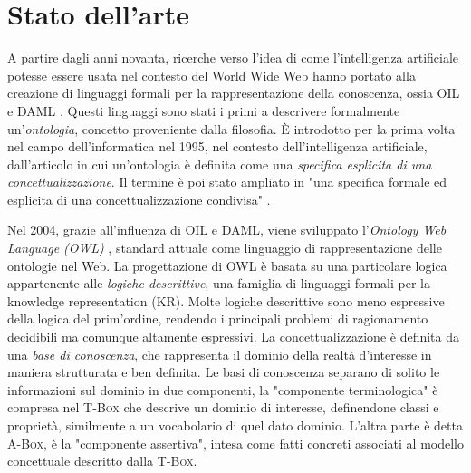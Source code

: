 \chapter[Stato dell'arte]{Stato dell'arte}
\label{chap:State-of-art}
A partire dagli anni novanta, ricerche verso l'idea di come l'intelligenza artificiale potesse essere usata nel contesto del World Wide Web hanno portato alla creazione di linguaggi formali per la rappresentazione della conoscenza, ossia OIL \cite{Horrocks2000TheOI} e DAML \cite{hendler2000darpa}. Questi linguaggi sono stati i primi a descrivere formalmente un'\textit{ontologia}, concetto proveniente dalla filosofia. È introdotto per la prima volta nel campo dell'informatica nel 1995, nel contesto dell'intelligenza artificiale, dall'articolo \cite{gruber1995} in cui un'ontologia è definita come una \textit{specifica esplicita di una concettualizzazione}. Il termine è poi stato ampliato in "una specifica formale ed esplicita di una concettualizzazione condivisa" \cite{goy2015ontologies}. 

Nel 2004, grazie all'influenza di OIL e DAML, viene sviluppato l'\textit{Ontology Web Language (OWL)} \cite{OWL}, standard attuale come linguaggio di rappresentazione delle ontologie nel Web. La progettazione di OWL è basata su una particolare logica appartenente alle \textit{logiche descrittive}, una famiglia di linguaggi formali per la knowledge representation (KR). Molte logiche descrittive sono meno espressive della logica del prim'ordine, rendendo i principali problemi di ragionamento decidibili ma comunque altamente espressivi. La concettualizzazione è definita da una \textit{base di conoscenza}, che rappresenta il dominio della realtà d'interesse in maniera strutturata e ben definita. Le basi di conoscenza separano di solito le informazioni sul dominio in due componenti, la "componente terminologica" è compresa nel \textsc{T-Box} che descrive un dominio di interesse, definendone classi e proprietà, similmente a un vocabolario di quel dato dominio. L'altra parte è detta \textsc{A-Box}, è la "componente assertiva", intesa come fatti concreti associati al modello concettuale descritto dalla \textsc{T-Box}.

